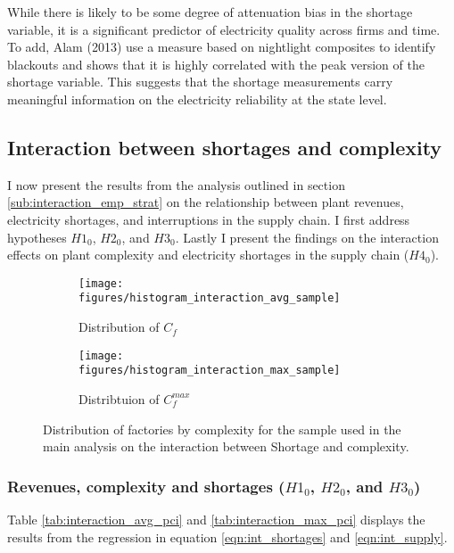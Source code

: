 \documentclass[11pt]{article}
\begin{document}
While there is likely to be some degree of attenuation bias in the shortage variable, it is a significant predictor of electricity quality across firms and time. To add, Alam (2013) use a measure based on nightlight composites to identify blackouts and shows that it is highly correlated with the peak version of the shortage variable. This suggests that the shortage measurements carry meaningful information on the electricity reliability at the state level.

\subsection{Interaction between shortages and complexity}%
\label{sub:regressions}

I now present the results from the analysis outlined in section \ref{sub:interaction_emp_strat} on the relationship between plant revenues, electricity shortages, and interruptions in the supply chain. I first address hypotheses $H1_0$, $H2_0$, and $H3_0$. Lastly I present the findings on the interaction effects on plant complexity and electricity shortages in the supply chain ($H4_0$).

\begin{figure}
     \centering
     \begin{subfigure}[b]{0.45\textwidth}
         \centering
         \texttt{[image: figures/histogram\_interaction\_avg\_sample]}
	 \caption{Distribution of $C_f$}
         \label{fig:interaction_sample_avg}
     \end{subfigure}
     \hfill
     \begin{subfigure}[b]{0.45\textwidth}
         \centering
         \texttt{[image: figures/histogram\_interaction\_max\_sample]}
	 \caption{Distribtuion of $C^{max}_{f}$}
         \label{fig:interaction_sample_max}
     \end{subfigure}
     \caption{Distribution of factories by complexity for the sample used in the main analysis on the interaction between Shortage and complexity.}
        \label{fig:interaction_sample}
\end{figure}

\subsubsection{Revenues, complexity and shortages ($H1_0$, $H2_0$, and $H3_0$)}
Table \ref{tab:interaction_avg_pci} and \ref{tab:interaction_max_pci} displays the results from the regression in equation \ref{eqn:int_shortages} and \ref{eqn:int_supply}.
\end{document}
